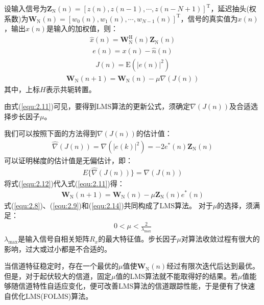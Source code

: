 设输入信号为$\mathbf{Z}_{\mathrm{N}}(n)=[z(n),z(n-1),\cdots,z(n-N+1)]^{\mathrm{T}}$，延迟抽头(权系数)为$\mathbf{W}_{\mathrm{N}}(n)=[w_0(n),w_1(n),\cdots,w_{N-1}(n)]^{\mathrm{T}}$，信号的真实值为$x(n)$，输出$\hat{x}(n)$是输入的加权值，则：
\begin{eqnarray}
    \hat{x}(n)=\mathbf{W}_{\mathrm{N}}^{\mathrm{H}}(n)\mathbf{Z}_{\mathrm{N}}(n)
    \label{equ:2.8}
\end{eqnarray}
\begin{eqnarray}
    e(n)=x(n)-\hat{n}(n)
    \label{equ:2.9}
\end{eqnarray}
\begin{eqnarray}
    J(n)=\mathrm{E}(|e(n)|^2)
    \label{equ:2.10}
\end{eqnarray}
\begin{eqnarray}
    \mathbf{W}_{\mathrm{N}}(n+1)=\mathbf{W}_{\mathrm{N}}(n)-\mu\nabla(J(n))
    \label{equ:2.11}
\end{eqnarray}
其中，上标$H$表示共轭转置。

由式(\ref{equ:2.11})可见，要得到LMS算法的更新公式，须确定$\nabla(J(n))$及合适选择步长因子$\mu$。

我们可以按照下面的方法得到$\nabla(J(n))$的估计值：
\begin{eqnarray}
    \widehat{\nabla}(J(n))=\nabla(|e(k)|^2)=-2e^*(n)\mathbf{Z}_{\mathrm{N}}(n)
    \label{equ:2.12}
\end{eqnarray}
可以证明梯度的估计值是无偏估计，即：
\begin{eqnarray}
    E\{\widehat{\nabla}(J(n))\}=\nabla(J(n))
    \label{equ:2.13}
\end{eqnarray}
将式(\ref{equ:2.12})代入式(\ref{equ:2.11})得：
\begin{eqnarray}
    \mathbf{W}_{\mathrm{N}}(n+1)=\mathbf{W}_{\mathrm{N}}(n)-\mu\mathbf{Z}_{\mathrm{N}}(n)e^*(n)
    \label{equ:2.14}
\end{eqnarray}
式(\ref{equ:2.8})、(\ref{equ:2.9})和(\ref{equ:2.14})共同构成了LMS算法。
对于$\mu$的选择，须满足：
\begin{eqnarray}
    0<\mu<\frac{2}{\lambda_{\mathrm{max}}}
    \label{equ:2.15}
\end{eqnarray}
$\lambda_{\mathrm{max}}$是输入信号自相关矩阵$R_x$的最大特征值。步长因子$\mu$对算法收敛过程有很大的影响，过大或过小都是不合适的。

当信道特征稳定时，存在一个最优的$\mu$值使$\mathbf{W}_{\mathrm{N}}(n)$经过有限次迭代后达到最优。但是，对于起伏较大的信道，固定$\mu$值的LMS算法就不能取得好的结果。若$\mu$值能够随信道特性自适应变化，便可改善LMS算法的信道跟踪性能，于是便有了快速自优化LMS(FOLMS)算法。
